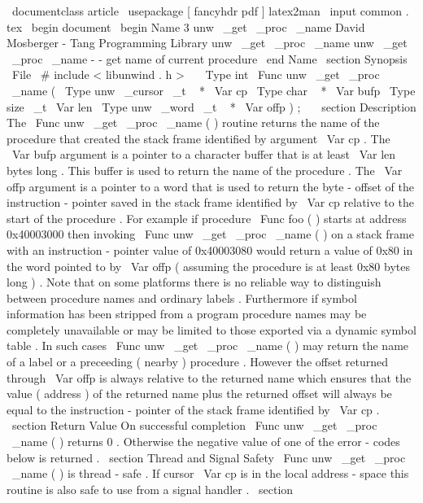 \
documentclass
{
article
}
\
usepackage
[
fancyhdr
pdf
]
{
latex2man
}
\
input
{
common
.
tex
}
\
begin
{
document
}
\
begin
{
Name
}
{
3
}
{
unw
\
_get
\
_proc
\
_name
}
{
David
Mosberger
-
Tang
}
{
Programming
Library
}
{
unw
\
_get
\
_proc
\
_name
}
unw
\
_get
\
_proc
\
_name
-
-
get
name
of
current
procedure
\
end
{
Name
}
\
section
{
Synopsis
}
\
File
{
\
#
include
<
libunwind
.
h
>
}
\
\
\
Type
{
int
}
\
Func
{
unw
\
_get
\
_proc
\
_name
}
(
\
Type
{
unw
\
_cursor
\
_t
~
*
}
\
Var
{
cp
}
\
Type
{
char
~
*
}
\
Var
{
bufp
}
\
Type
{
size
\
_t
}
\
Var
{
len
}
\
Type
{
unw
\
_word
\
_t
~
*
}
\
Var
{
offp
}
)
;
\
\
\
section
{
Description
}
The
\
Func
{
unw
\
_get
\
_proc
\
_name
}
(
)
routine
returns
the
name
of
the
procedure
that
created
the
stack
frame
identified
by
argument
\
Var
{
cp
}
.
The
\
Var
{
bufp
}
argument
is
a
pointer
to
a
character
buffer
that
is
at
least
\
Var
{
len
}
bytes
long
.
This
buffer
is
used
to
return
the
name
of
the
procedure
.
The
\
Var
{
offp
}
argument
is
a
pointer
to
a
word
that
is
used
to
return
the
byte
-
offset
of
the
instruction
-
pointer
saved
in
the
stack
frame
identified
by
\
Var
{
cp
}
relative
to
the
start
of
the
procedure
.
For
example
if
procedure
\
Func
{
foo
}
(
)
starts
at
address
0x40003000
then
invoking
\
Func
{
unw
\
_get
\
_proc
\
_name
}
(
)
on
a
stack
frame
with
an
instruction
-
pointer
value
of
0x40003080
would
return
a
value
of
0x80
in
the
word
pointed
to
by
\
Var
{
offp
}
(
assuming
the
procedure
is
at
least
0x80
bytes
long
)
.
Note
that
on
some
platforms
there
is
no
reliable
way
to
distinguish
between
procedure
names
and
ordinary
labels
.
Furthermore
if
symbol
information
has
been
stripped
from
a
program
procedure
names
may
be
completely
unavailable
or
may
be
limited
to
those
exported
via
a
dynamic
symbol
table
.
In
such
cases
\
Func
{
unw
\
_get
\
_proc
\
_name
}
(
)
may
return
the
name
of
a
label
or
a
preceeding
(
nearby
)
procedure
.
However
the
offset
returned
through
\
Var
{
offp
}
is
always
relative
to
the
returned
name
which
ensures
that
the
value
(
address
)
of
the
returned
name
plus
the
returned
offset
will
always
be
equal
to
the
instruction
-
pointer
of
the
stack
frame
identified
by
\
Var
{
cp
}
.
\
section
{
Return
Value
}
On
successful
completion
\
Func
{
unw
\
_get
\
_proc
\
_name
}
(
)
returns
0
.
Otherwise
the
negative
value
of
one
of
the
error
-
codes
below
is
returned
.
\
section
{
Thread
and
Signal
Safety
}
\
Func
{
unw
\
_get
\
_proc
\
_name
}
(
)
is
thread
-
safe
.
If
cursor
\
Var
{
cp
}
is
in
the
local
address
-
space
this
routine
is
also
safe
to
use
from
a
signal
handler
.
\
section
